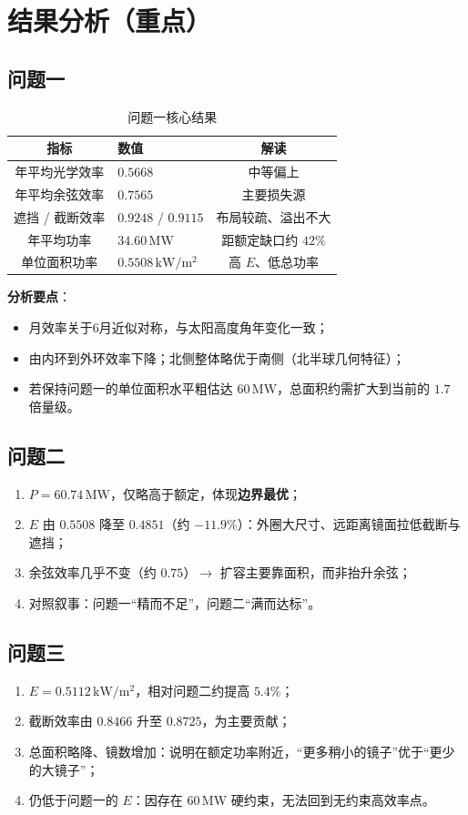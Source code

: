 \documentclass[12pt,a4paper]{ctexart}
\begin{document}
\section{结果分析（重点）}
\subsection{问题一}
\begin{table}[htbp]
\centering
\caption{问题一核心结果}
\begin{tabular}{clc}
\toprule
指标 & 数值 & 解读 \\
\midrule
年平均光学效率 & $0.5668$ & 中等偏上 \\
年平均余弦效率 & $0.7565$ & 主要损失源 \\
遮挡 / 截断效率 & $0.9248$ / $0.9115$ & 布局较疏、溢出不大 \\
年平均功率 & $34.60\,\mathrm{MW}$ & 距额定缺口约 $42\%$ \\
单位面积功率 & $0.5508\,\mathrm{kW/m^2}$ & 高 $E$、低总功率 \\
\bottomrule
\end{tabular}
\end{table}

\noindent\textbf{分析要点}：
\begin{itemize}
  \item 月效率关于6月近似对称，与太阳高度角年变化一致；
  \item 由内环到外环效率下降；北侧整体略优于南侧（北半球几何特征）；
  \item 若保持问题一的单位面积水平粗估达 $60\,\mathrm{MW}$，总面积约需扩大到当前的 $1.7$ 倍量级。
\end{itemize}

\subsection{问题二}
\begin{enumerate}
  \item $P=60.74\,\mathrm{MW}$，仅略高于额定，体现\textbf{边界最优}；
  \item $E$ 由 $0.5508$ 降至 $0.4851$（约 $-11.9\%$）：外圈大尺寸、远距离镜面拉低截断与遮挡；
  \item 余弦效率几乎不变（约 $0.75$）$\rightarrow$ 扩容主要靠面积，而非抬升余弦；
  \item 对照叙事：问题一“精而不足”，问题二“满而达标”。
\end{enumerate}

\subsection{问题三}
\begin{enumerate}
  \item $E=0.5112\,\mathrm{kW/m^2}$，相对问题二约提高 $5.4\%$；
  \item 截断效率由 $0.8466$ 升至 $0.8725$，为主要贡献；
  \item 总面积略降、镜数增加：说明在额定功率附近，“更多稍小的镜子”优于“更少的大镜子”；
  \item 仍低于问题一的 $E$：因存在 $60\,\mathrm{MW}$ 硬约束，无法回到无约束高效率点。
\end{enumerate}
\end{document}
